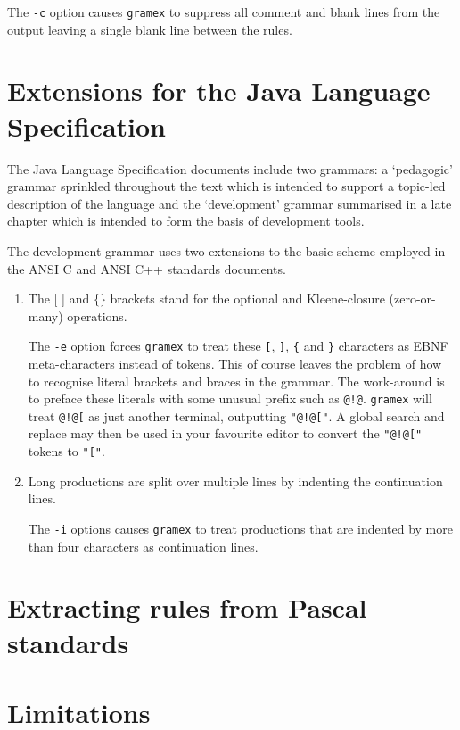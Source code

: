 \documentclass[11pt]{article}
\newcommand{\lt}{\tt}
\begin{document}
The \verb+-c+ option causes {\lt gramex} to suppress all comment and
blank lines from the output leaving a single blank line between the
rules.

\section{Extensions for the Java Language Specification}

The Java Language Specification documents include two grammars: a
`pedagogic' grammar sprinkled throughout the text which is intended to
support a topic-led description of the language and the `development'
grammar summarised in a late chapter which is intended to form the
basis of development tools.

The development grammar uses two extensions to the basic scheme
employed in the ANSI C and ANSI C++ standards documents.
\begin{enumerate}
\item The [ ] and $\{ \}$ brackets stand for the optional and
Kleene-closure (zero-or-many) operations.

The \verb+-e+ option forces {\lt gramex} to treat these \verb+[+,
\verb+]+, \verb+{+ and \verb+}+ characters as EBNF meta-characters
instead of tokens. This of course leaves the problem of how to
recognise literal brackets and braces in the grammar. The work-around
is to preface these literals with some unusual prefix such
as \verb+@!@+. {\lt gramex} will treat \verb+@!@[+ as just another
terminal, outputting \verb+"@!@["+. A global search and replace may then
be used in your favourite editor to convert the \verb+"@!@["+ tokens to
\verb+"["+.

\item Long productions are split over multiple lines by indenting the
continuation lines.

The {\tt -i} options causes {\tt gramex} to treat productions that are
indented by more than four characters as continuation lines.

\end{enumerate}

\section{Extracting rules from Pascal standards}

\section{Limitations}
\end{document}
